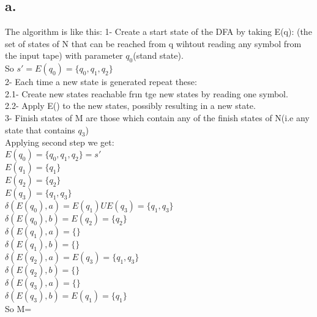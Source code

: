 \documentclass[12pt]{article}
\begin{document}
\subsection*{a.}
The algorithm is like this:
1- Create a start state of the DFA by taking E(q): (the set of states of N that can be reached from q wihtout reading any symbol from the input tape) with parameter $q_0$(stand state).
\\
So $s' = E(q_0)=\{ q_0,q_1,q_2  \}$
\\
2- Each time a new state is generated repeat these:
\\
 2.1- Create new states reachable frın tge new states by reading one symbol.
\\
2.2- Apply E() to the new states, possibly resulting in a new state.
\\
3- Finish states of M are those which contain any of the finish states of N(i.e any state that contains $q_3$)
\\
Applying second step we get:
\\
$E(q_0) = \{ q_0, q_1, q_2\}= s'$
\\
$E(q_1) = \{ q_1 \}$
\\
$E(q_2) = \{ q_2 \}$
\\
$E(q_3) = \{ q_1, q_3 \}$
\\
$\delta (E(q_0),a) = E(q_1) U E(q_3)= \{ q_1,q_3\} $
\\
$\delta (E(q_0),b) = E(q_2)= \{ q_2 \} $
\\
$\delta (E(q_1),a) =  \{ \} $
\\
$\delta (E(q_1),b) =  \{ \} $
\\
$\delta (E(q_2),a) = E(q_3)= \{ q_1,q_3\} $
\\
$\delta (E(q_2),b) = \{ \} $
\\
$\delta (E(q_3),a) = \{ \} $
\\
$\delta (E(q_3),b) = E(q_1)= \{ q_1\} $
\\
So M=
\\
\end{document}
